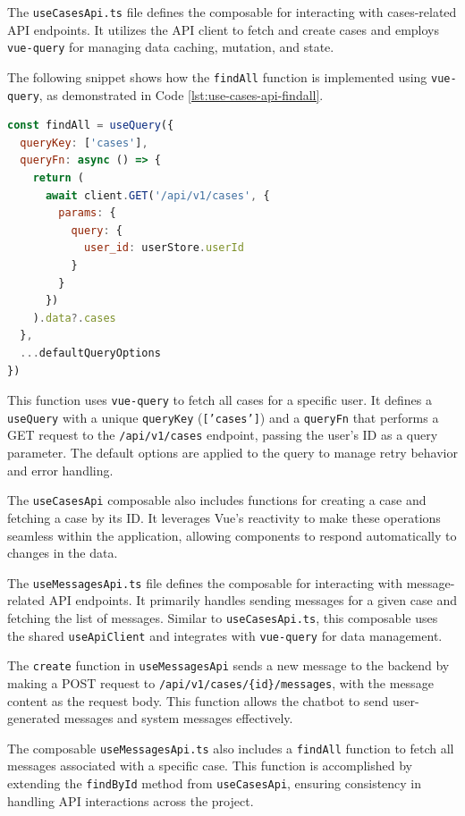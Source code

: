 The \texttt{useCasesApi.ts} file defines the composable for interacting with
cases-related \ac{API} endpoints. It utilizes the \ac{API} client to fetch and create cases and employs
\texttt{vue-query} for managing data caching, mutation, and state.

The following snippet shows how the \texttt{findAll} function is implemented using \texttt{vue-query}, as demonstrated
in Code \ref{lst:use-cases-api-findall}.

\begin{lstlisting}[language=JavaScript, caption={Fetching All Cases (\texttt{useCasesApi.ts})},
  firstnumber=19,label={lst:use-cases-api-findall}]
const findAll = useQuery({
  queryKey: ['cases'],
  queryFn: async () => {
    return (
      await client.GET('/api/v1/cases', {
        params: {
          query: {
            user_id: userStore.userId
          }
        }
      })
    ).data?.cases
  },
  ...defaultQueryOptions
})
\end{lstlisting}

This function uses \texttt{vue-query} to fetch all cases for a specific user.
It defines a \texttt{useQuery} with a unique \texttt{queryKey} (\texttt{['cases']}) and a \texttt{queryFn} that performs
a GET request to the \texttt{/api/v1/cases} endpoint, passing the user's ID as a query parameter. The
default options are applied to the query to manage retry behavior and error handling.

The \texttt{useCasesApi} composable also includes functions for creating a case and fetching a
case by its ID. It leverages Vue's reactivity to make
these operations seamless within the application, allowing components to respond automatically to changes in the data.

The \texttt{useMessagesApi.ts} file defines the composable for interacting with message-related
\ac{API} endpoints. It primarily handles sending messages for a given
case and fetching the list of messages. Similar to \texttt{useCasesApi.ts}, this composable uses the shared \texttt
{useApiClient} and integrates with \texttt{vue-query} for data management.

The \texttt{create} function in \texttt{useMessagesApi} sends a new message to the
backend by making a POST request to \texttt{/api/v1/cases/\{id\}/messages}, with the message content
as the request body. This function allows the chatbot to send user-generated messages and system messages effectively.

The composable \texttt{useMessagesApi.ts} also includes a \texttt{findAll} function to fetch all
messages associated with a specific case. This function is accomplished
by extending the \texttt{findById} method from \texttt{useCasesApi}, ensuring consistency in handling \ac{API}
interactions across the project.
